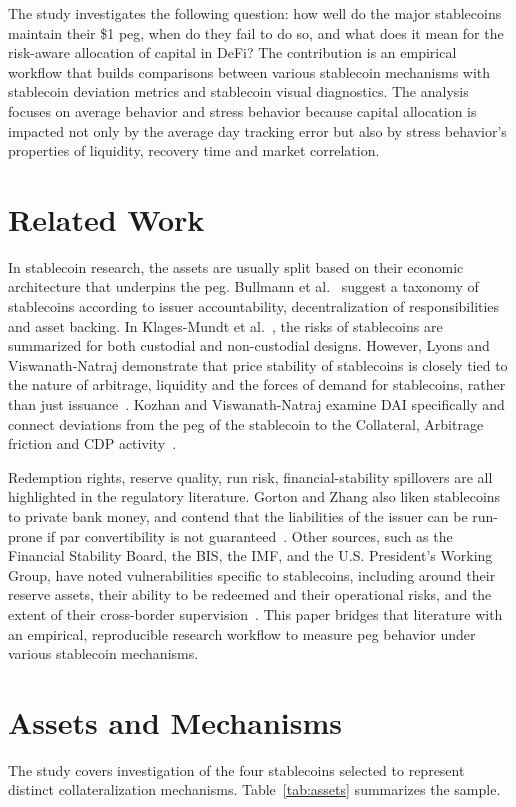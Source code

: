 \documentclass[conference]{IEEEtran}
\begin{document}
The study investigates the following question: how well do the major stablecoins maintain their \$1 peg, when do they fail to do so, and what does it mean for the risk-aware allocation of capital in DeFi? The contribution is an empirical workflow that builds comparisons between various stablecoin mechanisms with stablecoin deviation metrics and stablecoin visual diagnostics. The analysis focuses on average behavior and stress behavior because capital allocation is impacted not only by the average day tracking error but also by stress behavior's properties of liquidity, recovery time and market correlation.

\section{Related Work}
In stablecoin research, the assets are usually split based on their economic architecture that underpins the peg. Bullmann et al.~\cite{bullmann_2019_stablecoins} suggest a taxonomy of stablecoins according to issuer accountability, decentralization of responsibilities and asset backing. In Klages-Mundt et al.~\cite{klages_2020_stablecoins2}, the risks of stablecoins are summarized for both custodial and non-custodial designs. However, Lyons and Viswanath-Natraj demonstrate that price stability of stablecoins is closely tied to the nature of arbitrage, liquidity and the forces of demand for stablecoins, rather than just issuance~\cite{lyons_2023_stablecoins}. Kozhan and Viswanath-Natraj examine DAI specifically and connect deviations from the peg of the stablecoin to the Collateral, Arbitrage friction and CDP activity~\cite{kozhan_2021_dai}.

Redemption rights, reserve quality, run risk, financial-stability spillovers are all highlighted in the regulatory literature. Gorton and Zhang also liken stablecoins to private bank money, and contend that the liabilities of the issuer can be run-prone if par convertibility is not guaranteed~\cite{gorton_zhang_2023_wildcat}. Other sources, such as the Financial Stability Board, the BIS, the IMF, and the U.S. President's Working Group, have noted vulnerabilities specific to stablecoins, including around their reserve assets, their ability to be redeemed and their operational risks, and the extent of their cross-border supervision~\cite{fsb_2023_gsc,bis_2022_future_monetary,imf_2021_gfsr,pwg_2021_stablecoins}. This paper bridges that literature with an empirical, reproducible research workflow to measure peg behavior under various stablecoin mechanisms.
\section{Assets and Mechanisms}
The study covers investigation of the four stablecoins selected to represent distinct collateralization mechanisms. Table~\ref{tab:assets} summarizes the sample.
\end{document}
